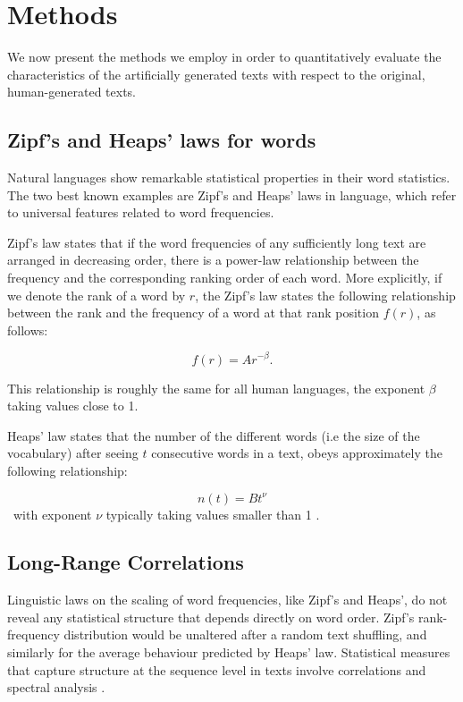 \documentclass[journal]{IEEEtran}
\begin{document}
\section{Methods}
\label{sec:methods}

We now present the methods we employ in order to quantitatively evaluate the characteristics of the artificially generated texts with respect to the original, human-generated texts.


\subsection{Zipf's and Heaps' laws for words}
\label{sec:ZipfHeap}

Natural languages show remarkable statistical properties in their word statistics.
The two best known examples are Zipf's \cite{Zipf1935} and Heaps' \cite{Heaps1978} laws in language,
which refer to universal features related to word frequencies.

Zipf's law states that if the word frequencies of any sufficiently long text are arranged in decreasing order,
there is a power-law relationship between the frequency and the corresponding ranking order of each word. More explicitly,
if we denote the rank of a word by $r$, the Zipf's law states the following relationship between the rank and the
frequency of a word at that rank position $f(r)$, as follows:

\begin{equation}
 f(r)=A r^{-\beta} .
\end{equation}

This relationship is roughly the same for all human languages, the exponent $\beta$ taking values close to 1.

Heaps' law states that the number of the different words (i.e the size of the vocabulary) after seeing $t$ consecutive words in a text,
obeys approximately the following relationship:

\begin{equation}
n(t)=B {t^{\nu}}
\end{equation}\,
with exponent $\nu$ typically taking values smaller than 1 \cite{Gerlach2013}.



\subsection{Long-Range Correlations}
\label{sec:correlations}

Linguistic laws on the scaling of word frequencies, like Zipf's and Heaps', do
not reveal any statistical structure that depends directly on word order.
Zipf's rank-frequency distribution would be unaltered after a random
text shuffling, and similarly for the average behaviour
predicted by Heaps' law. Statistical measures that
capture structure at the sequence level in texts involve correlations  and
spectral analysis \cite{Voss1975}.
\end{document}
